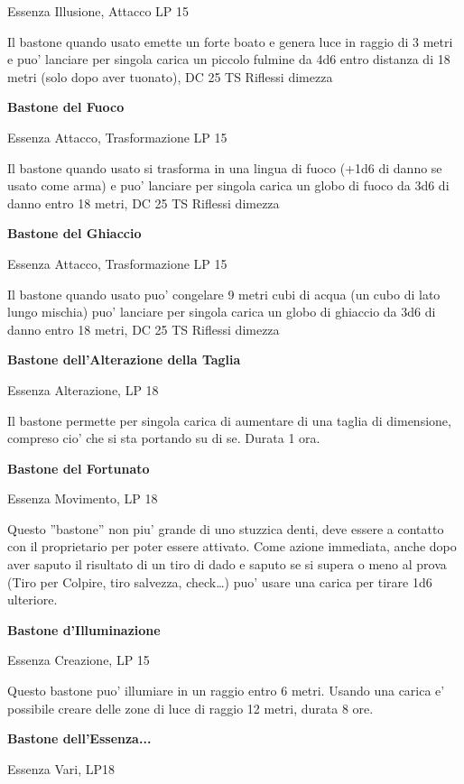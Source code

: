 \documentclass[a4paper,11pt,twoside,openany]{book}
\begin{document}
Essenza Illusione, Attacco LP 15

Il bastone quando usato emette un forte boato e genera luce in raggio di 3 metri e puo' lanciare per singola carica un piccolo fulmine da 4d6 entro distanza di 18 metri (solo dopo aver tuonato), DC 25 TS Riflessi dimezza

\textbf{Bastone del Fuoco}

Essenza Attacco, Trasformazione LP 15

Il bastone quando usato si trasforma in una lingua di fuoco (+1d6 di danno se usato come arma) e puo' lanciare per singola carica un globo di fuoco da 3d6 di danno entro 18 metri, DC 25 TS Riflessi dimezza

\textbf{Bastone del Ghiaccio}

Essenza Attacco, Trasformazione LP 15

Il bastone quando usato puo' congelare 9 metri cubi di acqua (un cubo di lato lungo mischia) puo' lanciare per singola carica un globo di ghiaccio da 3d6 di danno entro 18 metri, DC 25 TS Riflessi dimezza 

\textbf{Bastone dell'Alterazione della Taglia}

Essenza Alterazione, LP 18

Il bastone permette per singola carica di aumentare di una taglia di dimensione, compreso cio' che si sta portando su di se. Durata 1 ora.

\textbf{Bastone del Fortunato}

Essenza Movimento, LP 18

Questo ''bastone'' non piu' grande di uno stuzzica denti, deve essere a contatto con il proprietario per poter essere attivato. Come azione immediata, anche dopo aver saputo il risultato di un tiro di dado e saputo se si supera o meno al prova (Tiro per Colpire, tiro salvezza, check\ldots ) puo' usare una carica per tirare 1d6 ulteriore.

\textbf{Bastone d'Illuminazione}

Essenza Creazione, LP 15

Questo bastone puo' illumiare in un raggio entro 6 metri. Usando una carica e' possibile creare delle zone di luce di raggio 12 metri, durata 8 ore.

\textbf{Bastone dell'Essenza...}

Essenza Vari, LP18
\end{document}
